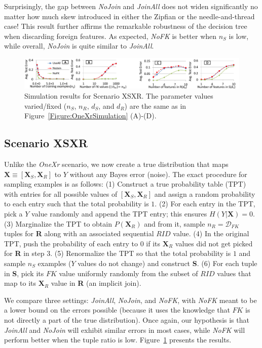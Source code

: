 \documentclass{vldb}
\begin{document}
Surprisingly, the gap between \textit{NoJoin} and \textit{JoinAll} does not widen significantly no matter how much skew introduced in either the Zipfian or the 
needle-and-thread case! This result further affirms the remarkable robustness of the decision tree when discarding foreign features. As expected, 
\textit{NoFK} is better when $n_S$ is low, while overall, \textit{NoJoin} is quite similar to \textit{JoinAll}.


\begin{figure}[t]
\centering
\includegraphics[width=0.99\linewidth]{xsxr1.pdf}
\caption{Simulation results for Scenario XSXR. The parameter values varied/fixed ($n_S$, $n_R$, $d_S$, and $d_R$) are the same as in Figure~\ref{Figure:OneXrSimulation} (A)-(D).}
\label{Figure:XsXrSimulation}
\end{figure}

\subsection{Scenario XSXR}

Unlike the \textit{OneXr} scenario, we now create a true distribution that maps $\textbf{X} \equiv [\textbf{X}_S, \textbf{X}_R]$ to $Y$ without any Bayes error (noise).
The exact procedure for sampling examples is as follows: (1) Construct a true probability table (TPT) with entries for all possible values of 
$[\textbf{X}_S, \textbf{X}_R]$ and assign a random probability to each entry such that the total probability is $1$.
(2) For each entry in the TPT, pick a $Y$ value randomly and append the TPT entry; this ensures $H(Y|\textbf{X}) = 0$.
(3) Marginalize the TPT to obtain $P(\textbf{X}_R)$ and from it, sample $n_R = \mathcal{D}_{FK}$ tuples for \textbf{R} along with an associated sequential $RID$ value.
(4) In the original TPT, push the probability of each entry to $0$ if its $\textbf{X}_R$ values did not get picked for \textbf{R} in step 3.
(5) Renormalize the TPT so that the total probability is $1$ and sample $n_S$ examples ($Y$ values do not change) and construct \textbf{S}.
(6) For each tuple in \textbf{S}, pick its $FK$ value uniformly randomly from the subset of $RID$ values that map to its $\textbf{X}_R$ value in \textbf{R} (an implicit join).

We compare three settings: \textit{JoinAll}, \textit{NoJoin}, and \textit{NoFK}, with \textit{NoFK} meant to be a lower bound on the errors possible (because 
it uses the knowledge that $FK$ is not directly a part of the true distribution). Once again, our hypothesis is that \textit{JoinAll} and \textit{NoJoin} will exhibit similar 
errors in most cases, while \textit{NoFK} will perform better when the tuple ratio is low. Figure~\ref{Figure:XsXrSimulation} presents the results.
\end{document}
